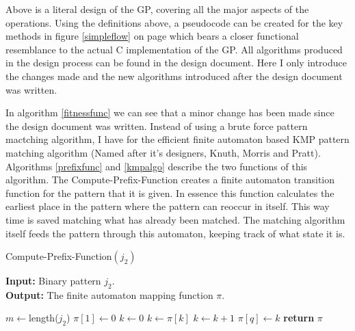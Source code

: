 \documentclass[a4paper,10.5pt]{article}
\begin{document}
Above is a literal design of the GP, covering all the major aspects of the operations. Using the definitions above, a pseudocode can be created for the key methods in figure \ref{simpleflow} on page \pageref{simpleflow} which bears a closer functional resemblance to the actual C implementation of the GP. All algorithms produced in the design process can be found in the design document. Here I only introduce the changes made and the new algorithms introduced after the design document was written. 

In algorithm \ref{fitnessfunc} we can see that a minor change has been made since the design document was written. Instead of using a brute force pattern mactching algorithm, I have for the efficient finite automaton based KMP pattern matching algorithm (Named after it's designers, Knuth, Morris and Pratt). Algorithms \ref{prefixfunc} and \ref{kmpalgo} describe the two functions of this algorithm. The Compute-Prefix-Function creates a finite automaton transition function for the pattern that it is given. In essence this function calculates the earliest place in the pattern where the pattern can reoccur in itself. This way time is saved matching what has already been matched. The matching algorithm itself feeds the pattern through this automaton, keeping track of what state it is.

\begin{algorithm}[H]
  \caption{Compute-Prefix-Function$(j_2)$}
  \textbf{Input:} Binary pattern $j_2$.\\
  \textbf{Output:} The finite automaton mapping function $\pi$.\\
  \begin{algorithmic}[1]
	\State $m \gets $length($j_2$)
	\State $\pi[1] \gets 0$
	\State $k \gets 0$
			\State $k \gets \pi[k]$
		\EndWhile
			\State $k \gets k + 1$
		\EndIf
		\State $\pi[q] \gets k$
	\EndFor
	\State \textbf{return} $\pi$ 

  \end{algorithmic}
\label{prefixfunc}
\end{algorithm}
\end{document}
